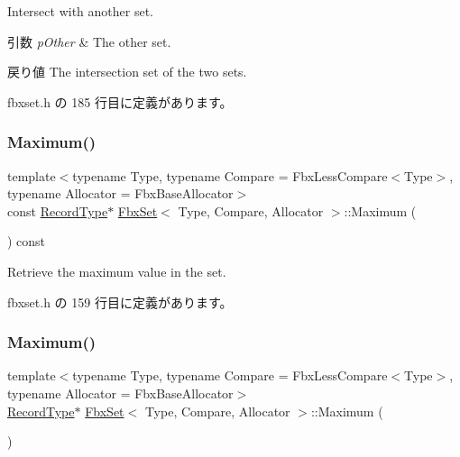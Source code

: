 Intersect with another set. 
\begin{DoxyParams}{引数}
{\em p\+Other} & The other set. \\
\hline
\end{DoxyParams}
\begin{DoxyReturn}{戻り値}
The intersection set of the two sets. 
\end{DoxyReturn}


 fbxset.\+h の 185 行目に定義があります。

\mbox{\label{class_fbx_set_af9e8e6c464ef4f379218c3ae85e211da}} 
\subsubsection{\texorpdfstring{Maximum()}{Maximum()}\hspace{0.1cm}{\footnotesize\ttfamily [1/2]}}
{\footnotesize\ttfamily template$<$typename Type, typename Compare = Fbx\+Less\+Compare$<$\+Type$>$, typename Allocator = Fbx\+Base\+Allocator$>$ \\
const \hyperlink{class_fbx_set_aa3934cd434a09288204f5e6c99b9cd01}{Record\+Type}$\ast$ \hyperlink{class_fbx_set}{Fbx\+Set}$<$ Type, Compare, Allocator $>$\+::Maximum (\begin{DoxyParamCaption}{ }\end{DoxyParamCaption}) const\hspace{0.3cm}{\ttfamily [inline]}}



Retrieve the maximum value in the set. 



 fbxset.\+h の 159 行目に定義があります。

\mbox{\label{class_fbx_set_a81b244938a3b473b59d146336737f8ed}} 
\subsubsection{\texorpdfstring{Maximum()}{Maximum()}\hspace{0.1cm}{\footnotesize\ttfamily [2/2]}}
{\footnotesize\ttfamily template$<$typename Type, typename Compare = Fbx\+Less\+Compare$<$\+Type$>$, typename Allocator = Fbx\+Base\+Allocator$>$ \\
\hyperlink{class_fbx_set_aa3934cd434a09288204f5e6c99b9cd01}{Record\+Type}$\ast$ \hyperlink{class_fbx_set}{Fbx\+Set}$<$ Type, Compare, Allocator $>$\+::Maximum (\begin{DoxyParamCaption}{ }\end{DoxyParamCaption})\hspace{0.3cm}{\ttfamily [inline]}}



